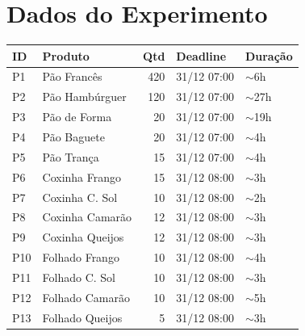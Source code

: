 \documentclass[11pt,a4paper]{article}
\begin{document}
\section{Dados do Experimento}

\begin{center}
\begin{tabular}{llrll}
\toprule
\textbf{ID} & \textbf{Produto} & \textbf{Qtd} & \textbf{Deadline} & \textbf{Duração} \\
\midrule
P1 & Pão Francês & 420 & 31/12 07:00 & $\sim$6h \\
P2 & Pão Hambúrguer & 120 & 31/12 07:00 & $\sim$27h \\
P3 & Pão de Forma & 20 & 31/12 07:00 & $\sim$19h \\
P4 & Pão Baguete & 20 & 31/12 07:00 & $\sim$4h \\
P5 & Pão Trança & 15 & 31/12 07:00 & $\sim$4h \\
P6 & Coxinha Frango & 15 & 31/12 08:00 & $\sim$3h \\
P7 & Coxinha C. Sol & 10 & 31/12 08:00 & $\sim$2h \\
P8 & Coxinha Camarão & 12 & 31/12 08:00 & $\sim$3h \\
P9 & Coxinha Queijos & 12 & 31/12 08:00 & $\sim$3h \\
P10 & Folhado Frango & 10 & 31/12 08:00 & $\sim$4h \\
P11 & Folhado C. Sol & 10 & 31/12 08:00 & $\sim$3h \\
P12 & Folhado Camarão & 10 & 31/12 08:00 & $\sim$5h \\
P13 & Folhado Queijos & 5 & 31/12 08:00 & $\sim$3h \\
\bottomrule
\end{tabular}
\end{center}
\end{document}
